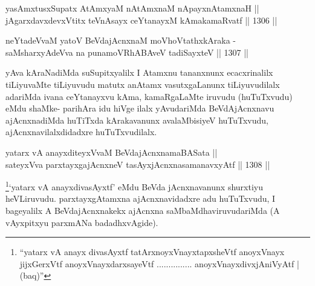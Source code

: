 \begin{shl}
yasAmxtusxSupatx AtAmx\s yaM nA\s \s tAmxnaM nApayxnAtamxnaH || \\
jAgarxdavxdevxVtitx teVnAsayx ceYtanayxM kAmakamaRvatf \hfill || 1306 ||  
\end{shl}

\begin{shl}
neYtadeVvaM \footnotemark[2]yatoV BeVdajAcnxnaM moVhoVtathxkAraka -\\
saMsharxyAdeVva na punamoVRhABAveV tadiSayxteV \hfill || 1307 ||  
\end{shl}

\begin{artha}
yAva kAraNadiMda suSupitxyalilx I Atamxnu tananxnunx ecacxrinalilx tiLiyuvaMte tiLiyuvudu matutx anAtamx vasutxgaLanunx tiLiyuvudilalx adariMda ivana ceYtanayxvu kAma, kamaRgaLaMte iruvudu (huTuTxvudu) eMdu shaMke-
parihAra idu hiVge ilalx yAvudariMda BeVdAjAcnxnavu ajAcnxnadiMda huTiTxda kArakavanunx avalaMbisiyeV huTuTxvudu, ajAcnxnavilalxdidadxre huTuTxvudilalx.
\end{artha}


\begin{shl}
yatarx vA anayxditeyxVvaM BeVdajAcnxnamaBASata || \\
sateyxVva parxtayxgajAcnxneV tasAyxjAcnxnasamanavxyAtf \hfill || 1308 ||  
\end{shl}

\begin{artha}
\footnote[1]{``yatarx vA anayx divasAyxtf tatArxnoyxV\s nayxtapxsheVtf anoyxV\s nayx jijxGerxVtf anoyxV\s nayxdarxsayeVtf ............... anoyxV\s nayxdivxjAniVyAtf | (baq)''}`yatarx vA anayxdivasAyxtf' eMdu BeVda jAcnxnavanunx shurxtiyu heVLiruvudu. parxtayxgAtamxna ajAcnxnavidadxre adu huTuTxvudu, I bageyalilx A BeVdajAcnxnakekx ajAcnxna saMbaMdhaviruvudariMda (A vAyxpitxyu parxmANa badadhxvAgide).
\end{artha}

